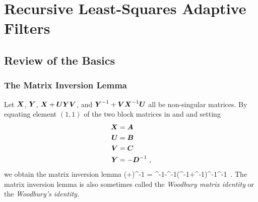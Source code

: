 \chapter{Recursive Least-Squares Adaptive Filters}
\label{ch:RLS}
\section{Review of the Basics}
\subsection{The Matrix Inversion Lemma}
\label{sec:woodbury}
Let $\boldsymbol{X}$, $\boldsymbol{Y}$, $\boldsymbol{X}+\boldsymbol{UYV}$, and $\boldsymbol{Y}^{-1}+\boldsymbol{VX}^{-1}\boldsymbol{U}$ all be non-singular matrices. By equating element $(1,1)$ of the two block matrices in  and  and setting
\begin{align}
  \boldsymbol{X} &= \boldsymbol{A}\\
  \boldsymbol{U} &= \boldsymbol{B}\\
  \boldsymbol{V} &= \boldsymbol{C}\\
  \boldsymbol{Y} &= -\boldsymbol{D}^{-1}\ ,
\end{align}
we obtain the matrix inversion lemma
\bmath
  (+)^{-1} = ^{-1}-^{-1}(^{-1}+^{-1})^{-1}^{-1}\ .
  \label{eq:woodbury}
\emath
The matrix inversion lemma is also sometimes called the \textit{Woodbury matrix identity} or the \textit{Woodbury's identity}.

